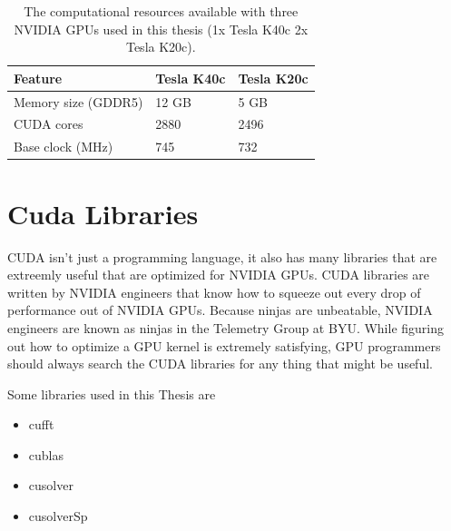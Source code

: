 \begin{table}
\begin{center}
\begin{tabular}{lll}
	\toprule
	Feature 			& Tesla K40c 	& Tesla K20c 	\\ \midrule
	Memory size (GDDR5) & 12 GB 		& 5 GB 			\\
	CUDA cores 			& 2880 			& 2496 			\\
	Base clock (MHz) 	& 745 			& 732 			\\ \bottomrule
\end{tabular}
\end{center}
\caption{The computational resources available with three NVIDIA GPUs used in this thesis (1x Tesla K40c 2x Tesla K20c).}
\label{tab:gpu-resources_jeffs}
\end{table}

\section{Cuda Libraries}
CUDA isn't just a programming language, it also has many libraries that are extreemly useful that are optimized for NVIDIA GPUs.
CUDA libraries are written by NVIDIA engineers that know how to squeeze out every drop of performance out of NVIDIA GPUs.
Because ninjas are unbeatable, NVIDIA engineers are known as ninjas in the Telemetry Group at BYU.
While figuring out how to optimize a GPU kernel is extremely satisfying, GPU programmers should always search the CUDA libraries for any thing that might be useful.

Some libraries used in this Thesis are
\begin{itemize}
  \item cufft
  \item cublas
  \item cusolver
  \item cusolverSp
\end{itemize}

